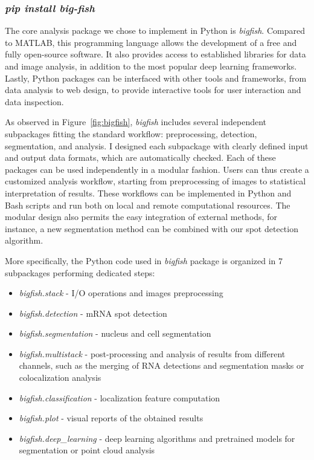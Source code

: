 \subsubsection{\emph{pip install big-fish}}

The core analysis package we chose to implement in Python is \emph{bigfish}.
Compared to MATLAB, this programming language allows the development of a free and fully open-source software.
It also provides access to established libraries for data and image analysis, in addition to the most popular deep learning frameworks.
Lastly, Python packages can be interfaced with other tools and frameworks, from data analysis to web design, to provide interactive tools for user interaction and data inspection.

As observed in Figure~\ref{fig:bigfish}, \emph{bigfish} includes several independent subpackages fitting the standard workflow: preprocessing, detection, segmentation, and analysis.
I designed each subpackage with clearly defined input and output data formats, which are automatically checked.
Each of these packages can be used independently in a modular fashion.
Users can thus create a customized analysis workflow, starting from preprocessing of images to statistical interpretation of results.
These workflows can be implemented in Python and Bash scripts and run both on local and remote computational resources.
The modular design also permits the easy integration of external methods, for instance, a new segmentation method can be combined with our spot detection algorithm.

More specifically, the Python code used in \emph{bigfish} package is organized in 7 subpackages performing dedicated steps:
\begin{itemize}
	\setlength\itemsep{0.1em}
	\item \emph{bigfish.stack} - I/O operations and images preprocessing
	\item \emph{bigfish.detection} - \ac{mRNA} spot detection
	\item \emph{bigfish.segmentation} - nucleus and cell segmentation
	\item \emph{bigfish.multistack} - post-processing and analysis of results from different channels, such as the merging of \ac{RNA} detections and segmentation masks or colocalization analysis
	\item \emph{bigfish.classification} - localization feature computation
	\item \emph{bigfish.plot} - visual reports of the obtained results
	\item \emph{bigfish.deep\_learning} - deep learning algorithms and pretrained models for segmentation or point cloud analysis
\end{itemize}


